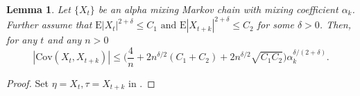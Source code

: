 \documentclass[11pt]{amsart}
\newcommand{\E}{\mathrm{E}}
\newcommand{\Cov}{\mathrm{Cov}}
\newtheorem{lemma}{Lemma}[section]
\newenvironment{customlemma}[1]
  {\renewcommand\theinnercustomlemma{#1}\innercustomlemma}
  {\endinnercustomlemma}
\begin{document}
\begin{lemma}\label{lem:corr-bound2}
Let $\{X_t\}$ be an alpha mixing Markov chain with mixing coefficient $\alpha_k$. Further assume that $\E|X_t|^{2+\delta}\leq C_1 \text{ and } \E|X_{t+k}|^{2+\delta}\leq C_2$ for some $\delta>0$.
Then, for any $t$ and any $n>0$
\begin{equation}\label{ibr}
    |\Cov(X_t,X_{t+k})| \leq 
    \bigg(\frac{4}{n} +
     2n^{\delta/2}(C_1+C_2)+
     2n^{\delta/2}\sqrt{C_1C_2}\bigg)\alpha_k^{\delta/(2+\delta)}.
\end{equation}
\end{lemma}
\begin{proof}
Set $\eta=X_t, \tau=X_{t+k}$ in .
\end{proof}
\end{document}
